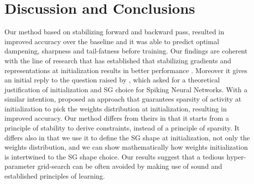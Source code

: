 
\section{Discussion and Conclusions}



Our method based on stabilizing forward and backward pass, resulted in improved accuracy over the baseline and it was able to predict optimal dampening, sharpness and tail-fatness before training. 
Our findings are coherent with the line of research that has established that stabilizing gradients and representations at initialization results in better performance \cite{glorot2010understanding, orthogonal_initialization, he2015delving, roberts2022principles, defazio2022scaling, bengio1994learning, hochreiter1997long, hochreiter2001gradient, arjovsky2016unitary, pascanu2013difficulty}. Moreover it gives an initial reply to the question raised by
\cite{surrogate2019, zenke2021remarkable}, which asked  for a theoretical justification of initialization and SG choice for Spiking Neural Networks. With a similar intention, \cite{rossbroich2022fluctuation} proposed an approach that guarantees sparsity of activity at initialization to pick the weights distribution at initialization, resulting in improved accuracy. Our method differs from theirs in that it starts from a principle of stability to derive constraints, instead of a principle of sparsity. It differs also in that we use it to define the SG shape at initialization, not only the weights distribution, and we can show mathematically how weights initialization is intertwined to the SG shape choice. Our results suggest that a tedious hyper-parameter grid-search can be often avoided by making use of sound and established principles of learning.


